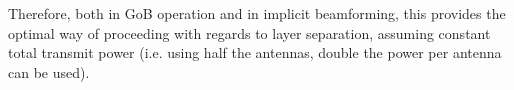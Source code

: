 Therefore, both in GoB operation and in implicit beamforming, this provides the optimal way of proceeding with regards to layer separation, assuming constant total transmit power (i.e. using half the antennas, double the power per antenna can be used).






